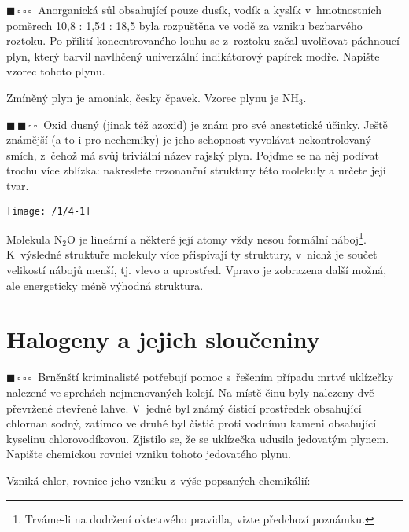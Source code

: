 \documentclass{book}
\newcommand{\jeden}{$\blacksquare \, \square \, \square \, \square \; \; $}
\newcommand{\dva}{$\blacksquare \, \blacksquare \, \square \, \square \; \; $}
\renewenvironment{quotation}{\par}{\par} %
\begin{document}
\hrulefill %
\begin{quotation}
\jeden Anorganická sůl obsahující pouze dusík, vodík a kyslík v~hmotnostních
poměrech 10,8 : 1,54 : 18,5 byla rozpuštěna ve vodě za vzniku bezbarvého
roztoku. Po přilití koncentrovaného louhu se z~roztoku začal uvolňovat
páchnoucí plyn, který barvil navlhčený univerzální indikátorový papírek
modře. Napište vzorec tohoto plynu.
\end{quotation} \dotfill \par 
Zmíněný plyn je amoniak, česky čpavek. Vzorec plynu je $\mathrm{NH_{3}}.$

\hrulefill %
\begin{quotation}
\dva Oxid dusný (jinak též azoxid) je znám pro své anestetické účinky.
Ještě známější (a to i pro nechemiky) je jeho schopnost vyvolávat
nekontrolovaný smích, z~čehož má svůj triviální název rajský plyn.
Pojďme se na něj podívat trochu více zblízka: nakreslete rezonanční
struktury této molekuly a určete její tvar.
\end{quotation} \dotfill \par 
\begin{center}
\texttt{[image: /1/4-1]}
\end{center}

Molekula $\mathrm{N_{2}O}$ je lineární a některé její atomy vždy
nesou formální náboj\footnote{Trváme-li na dodržení oktetového pravidla, vizte předchozí poznámku.}. K~výsledné struktuře molekuly více přispívají
ty struktury, v~nichž je součet velikostí nábojů menší, tj. vlevo
a uprostřed. Vpravo je zobrazena další možná, ale energeticky méně
výhodná struktura. 

\newpage %
\section{Halogeny a jejich sloučeniny}

\begin{quotation}
\jeden Brněnští kriminalisté potřebují pomoc s~řešením případu mrtvé uklízečky
nalezené ve sprchách nejmenovaných kolejí. Na místě činu byly nalezeny
dvě převržené otevřené lahve. V~jedné byl známý čisticí prostředek
obsahující chlornan sodný, zatímco ve druhé byl čistič proti vodnímu
kameni obsahující kyselinu chlorovodíkovou. Zjistilo se, že se uklízečka
udusila jedovatým plynem. Napište chemickou rovnici vzniku tohoto
jedovatého plynu. 
\end{quotation} \dotfill \par 
Vzniká chlor, rovnice jeho vzniku z~výše popsaných chemikálií:
\end{document}
